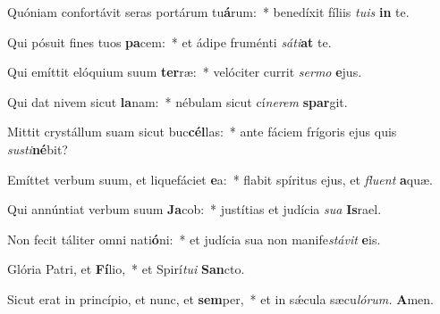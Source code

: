 \item Quóniam confortávit seras portárum tu\textbf{á}rum:~* benedíxit fíliis \textit{tuis} \textbf{in} te.
\item Qui pósuit fines tuos \textbf{pa}cem:~* et ádipe fruménti \textit{sáti}\textbf{at} te.
\item Qui emíttit elóquium suum \textbf{ter}ræ:~* velóciter currit \textit{sermo} \textbf{e}jus.
\item Qui dat nivem sicut \textbf{la}nam:~* nébulam sicut cí\tinyhspace\textit{nerem} \textbf{spar}git.
\item Mittit crystállum suam sicut buc\textbf{cél}las:~* ante fáciem frígoris ejus quis \textit{susti}\textbf{né}bit?
\item Emíttet verbum suum, et liquefáciet \textbf{e}a:~* flabit spíritus ejus, et \textit{fluent} \textbf{a}quæ.
\item Qui annúntiat verbum suum \textbf{Ja}cob:~* justítias et judícia \textit{sua} \textbf{Is}rael.
\item Non fecit táliter omni nati\textbf{ó}ni:~* et judícia sua non manife\tinyhspace\textit{stávit} \textbf{e}is.
\item Glória Patri, et \textbf{Fí}lio,~* et Spirí\tinyhspace\textit{tui} \textbf{San}cto.
\item Sicut erat in princípio, et nunc, et \textbf{sem}per,~* et in sǽcula sæcu\tinyhspace\textit{lórum.} \textbf{A}men.